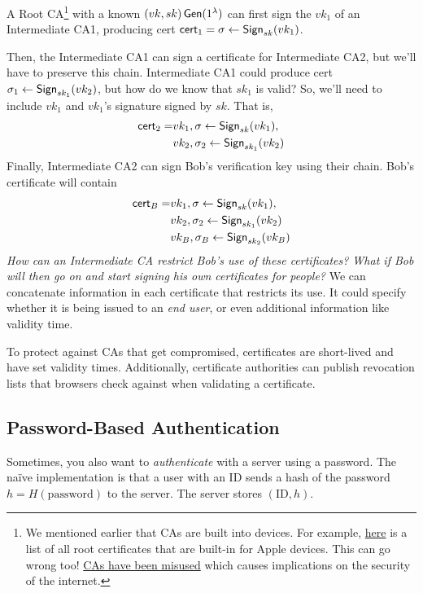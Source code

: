 
A Root CA\footnote{We mentioned earlier that CAs are built into devices. For example, \href{https://support.apple.com/en-us/HT213464}{here} is a list of all root certificates that are built-in for Apple devices. This can go wrong too! \href{https://en.wikipedia.org/wiki/Root_certificate\#Incidents_of_root_certificate_misuse}{CAs have been misused} which causes implications on the security of the internet.} with a known $(vk, sk)\operatorname{\mathsf{Gen}}(1^\lambda)$ can first sign the $vk_1$ of an Intermediate CA1, producing cert $\mathsf{cert}_1 = \sigma \leftarrow \operatorname{\mathsf{Sign}}_{sk}(vk_1)$.

Then, the Intermediate CA1 can sign a certificate for Intermediate CA2, but we'll have to preserve this chain. Intermediate CA1 could produce cert $\sigma_1\leftarrow\operatorname{\mathsf{Sign}}_{sk_1}(vk_2)$, but how do we know that $sk_1$ is valid? So, we'll need to include $vk_1$ and $vk_1$'s signature signed by $sk$. That is,
\begin{align*}
    \mathsf{cert}_2 = & vk_1, \sigma \leftarrow \operatorname{\mathsf{Sign}}_{sk}(vk_1),   \\
                      & vk_2, \sigma_2\leftarrow \operatorname{\mathsf{Sign}}_{sk_1}(vk_2)
\end{align*}
Finally, Intermediate CA2 can sign Bob's verification key using their chain. Bob's certificate will contain
\begin{align*}
    \mathsf{cert}_B = & vk_1, \sigma \leftarrow \operatorname{\mathsf{Sign}}_{sk}(vk_1),   \\
                      & vk_2, \sigma_2\leftarrow \operatorname{\mathsf{Sign}}_{sk_1}(vk_2) \\
                      & vk_B, \sigma_B\leftarrow \operatorname{\mathsf{Sign}}_{sk_2}(vk_B)
\end{align*}
\emph{How can an Intermediate CA restrict Bob's use of these certificates? What if Bob will then go on and start signing his own certificates for people?} We can concatenate information in each certificate that restricts its use. It could specify whether it is being issued to an \emph{end user}, or even additional information like validity time.

To protect against CAs that get compromised, certificates are short-lived and have set validity times. Additionally, certificate authorities can publish revocation lists that browsers check against when validating a certificate.

\subsection{Password-Based Authentication}
Sometimes, you also want to \emph{authenticate} with a server using a password. The na\"ive implementation is that a user with an ID sends a hash of the password $h = H(\mathrm{password})$ to the server. The server stores $(\mathrm{ID}, h)$.

